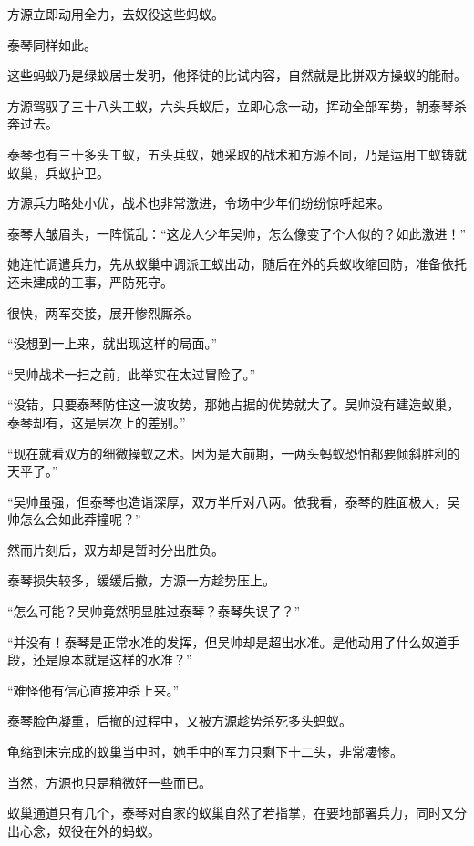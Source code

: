 
\begin{this_body}



方源立即动用全力，去奴役这些蚂蚁。

泰琴同样如此。

这些蚂蚁乃是绿蚁居士发明，他择徒的比试内容，自然就是比拼双方操蚁的能耐。

方源驾驭了三十八头工蚁，六头兵蚁后，立即心念一动，挥动全部军势，朝泰琴杀奔过去。

泰琴也有三十多头工蚁，五头兵蚁，她采取的战术和方源不同，乃是运用工蚁铸就蚁巢，兵蚁护卫。

方源兵力略处小优，战术也非常激进，令场中少年们纷纷惊呼起来。

泰琴大皱眉头，一阵慌乱：“这龙人少年吴帅，怎么像变了个人似的？如此激进！”

她连忙调遣兵力，先从蚁巢中调派工蚁出动，随后在外的兵蚁收缩回防，准备依托还未建成的工事，严防死守。

很快，两军交接，展开惨烈厮杀。

“没想到一上来，就出现这样的局面。”

“吴帅战术一扫之前，此举实在太过冒险了。”

“没错，只要泰琴防住这一波攻势，那她占据的优势就大了。吴帅没有建造蚁巢，泰琴却有，这是层次上的差别。”

“现在就看双方的细微操蚁之术。因为是大前期，一两头蚂蚁恐怕都要倾斜胜利的天平了。”

“吴帅虽强，但泰琴也造诣深厚，双方半斤对八两。依我看，泰琴的胜面极大，吴帅怎么会如此莽撞呢？”

然而片刻后，双方却是暂时分出胜负。

泰琴损失较多，缓缓后撤，方源一方趁势压上。

“怎么可能？吴帅竟然明显胜过泰琴？泰琴失误了？”

“并没有！泰琴是正常水准的发挥，但吴帅却是超出水准。是他动用了什么奴道手段，还是原本就是这样的水准？”

“难怪他有信心直接冲杀上来。”

泰琴脸色凝重，后撤的过程中，又被方源趁势杀死多头蚂蚁。

龟缩到未完成的蚁巢当中时，她手中的军力只剩下十二头，非常凄惨。

当然，方源也只是稍微好一些而已。

蚁巢通道只有几个，泰琴对自家的蚁巢自然了若指掌，在要地部署兵力，同时又分出心念，奴役在外的蚂蚁。


\end{this_body}
